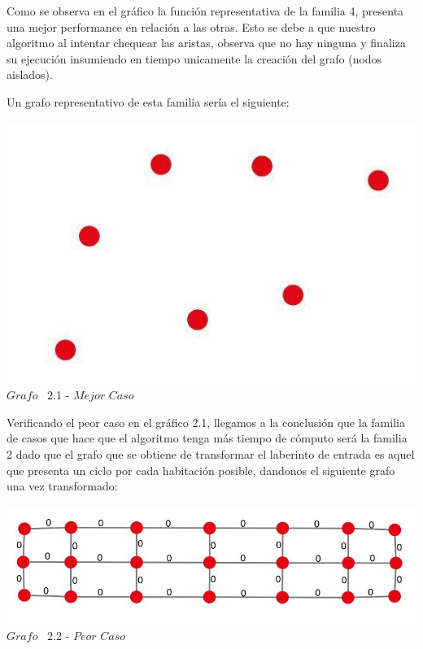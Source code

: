 Como se observa en el gr\'afico la funci\'on representativa de la familia 4, presenta una mejor performance en relaci\'on a las otras. Esto se debe a que nuestro algoritmo al intentar chequear las aristas, observa que no hay ninguna y finaliza su ejecuci\'on insumiendo en tiempo unicamente la creaci\'on del grafo (nodos aislados).

Un grafo representativo de esta familia ser\'ia el siguiente:

\vspace*{0.3cm} \vspace*{0.3cm}
  \begin{center}
 \includegraphics[scale=0.5]{./EJ2/grafoSinEjes.jpeg}
 \\{$Grafo$ \ 2.1 - $Mejor$ $Caso$}
  \end{center}
  \vspace*{0.3cm}

Verificando el peor caso en el gráfico 2.1, llegamos a la conclusi\'on que la familia de casos que hace que el algoritmo tenga más tiempo de cómputo ser\'a la familia 2 dado que el grafo que se obtiene de transformar el laberinto de entrada es aquel que presenta un ciclo por cada habitaci\'on posible, dandonos el siguiente grafo una vez transformado:\\

\vspace*{0.3cm} \vspace*{0.3cm}
  \begin{center}
 \includegraphics[scale=0.5]{./EJ2/ej2grafosinpared.jpeg}
 \\{$Grafo$ \ 2.2 - $Peor$ $Caso$}
  \end{center}
  \vspace*{0.3cm}


